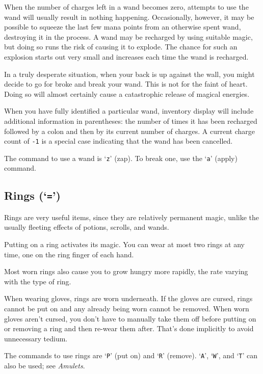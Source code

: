 When the number of charges left in a wand becomes zero, attempts to use the
wand will usually result in nothing happening.  Occasionally, however, it may
be possible to squeeze the last few mana points from an otherwise spent wand,
destroying it in the process.  A wand may be recharged by using suitable
magic, but doing so runs the risk of causing it to explode.  The chance
for such an explosion starts out very small and increases each time the
wand is recharged.

In a truly desperate situation, when your back is up against the wall, you
might decide to go for broke and break your wand.  This is not for the faint
of heart.  Doing so will almost certainly cause a catastrophic release of
magical energies.

When you have fully identified a particular wand, inventory display will
include additional information in parentheses: the number of times it has
been recharged followed by a colon and then by its current number of charges.
A current charge count of {\tt -1} is a special case indicating that the wand
has been cancelled.

The command to use a wand is `{\tt z}' (zap).  To break one, use the `{\tt a}'
(apply) command.

\subsection*{Rings (`{\tt =}')}

Rings are very useful items, since they are relatively permanent
magic, unlike the usually fleeting effects of potions, scrolls, and
wands.

Putting on a ring activates its magic.
You can wear at most two rings at any time, one on the ring finger of
each hand.

Most worn rings also cause you to grow hungry more rapidly, the rate
varying with the type of ring.

When wearing gloves, rings are worn underneath.
If the gloves are cursed, rings cannot be put on and any already being
worn cannot be removed.
When worn gloves aren't cursed, you don't have to manually take them
off before putting on or removing a ring and then re-wear them after.
That's done implicitly to avoid unnecessary tedium.

The commands to use rings are `{\tt P}' (put on) and `{\tt R}' (remove).
`{\tt A}', `{\tt W}', and `{\tt T}' can also be used; see {\it Amulets\/}.

